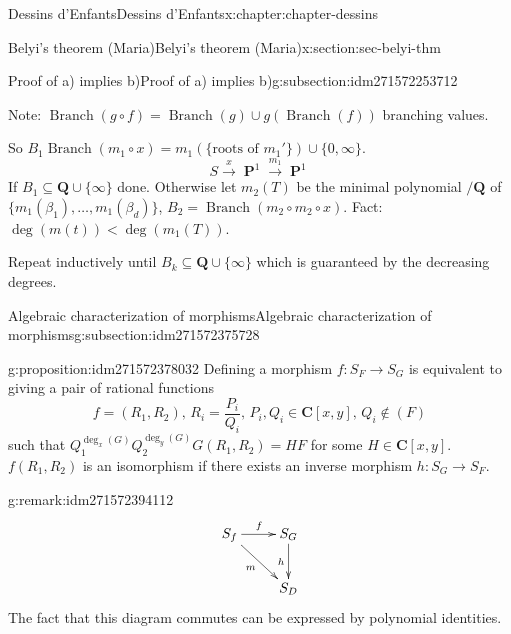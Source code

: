 \documentclass[oneside,10pt,]{book}
\numberwithin{equation}{section}
\newcommand{\lb}{[}
\newcommand{\rb}{]}
\newcommand{\QQ}{\mathbf{Q}}
\newcommand{\CC}{\mathbf{C}}
\DeclareMathOperator{\PP}{\mathbf{P}}
\newcommand{\lt}{<}
\begin{document}
\begin{chapterptx}{Dessins d'Enfants}{}{Dessins d'Enfants}{}{}{x:chapter:chapter-dessins}
\begin{sectionptx}{Belyi's theorem (Maria)}{}{Belyi's theorem (Maria)}{}{}{x:section:sec-belyi-thm}
\begin{subsectionptx}{Proof of a) implies b)}{}{Proof of a) implies b)}{}{}{g:subsection:idm271572253712}
\par
Note: \(\operatorname{Branch}(g\circ f) = \operatorname{Branch}(g) \cup g(\operatorname{Branch}(f))\) branching values.%
\par
So \(B_1 \operatorname{Branch}(m_1 \circ x) = m_1(\{\text{roots of }m_1'\}) \cup\{0,\infty\}\).%
\begin{equation*}
S\xrightarrow x \PP^1 \xrightarrow{m_1} \PP^1
\end{equation*}
If \(B_1 \subseteq \QQ \cup \{\infty\}\) done. Otherwise let \(m_2(T) \) be the minimal polynomial \(/\QQ\) of \(\{m_1(\beta_1) ,\ldots, m_1(\beta_d) \}\), \(B_2 = \operatorname{Branch}(m_2\circ m_2 \circ x)\). Fact: \(\deg(m(t)) \lt \deg(m_1(T))\).%
\par
Repeat inductively until \(B_k \subseteq \QQ \cup \{\infty\}\) which is guaranteed by the decreasing degrees.%
\end{subsectionptx}
%
%
\typeout{************************************************}
\typeout{************************************************}
%
\begin{subsectionptx}{Algebraic characterization of morphisms}{}{Algebraic characterization of morphisms}{}{}{g:subsection:idm271572375728}
\begin{proposition}{}{}{g:proposition:idm271572378032}%
Defining a morphism \(f \colon S_F\to S_G\) is equivalent to giving a pair of rational functions%
\begin{equation*}
f=  (R_1, R_2),\,R_i= \frac{P_i}{Q_i},\,    P_i,Q_i\in \CC[x,y],\,Q_i\not\in (F)
\end{equation*}
such that \(Q_1^{\deg_x(G)}Q_2^{\deg_y(G)} G(R_1, R_2) = HF\) for some \(H \in \CC\lb x, y\rb\). \(f(R_1, R_2)\) is an isomorphism if there exists an inverse morphism \(h\colon S_G\to S_F\).%
\end{proposition}
\begin{remark}{}{g:remark:idm271572394112}%
%
\begin{equation*}
\xymatrix{
S_f \ar[r]^f \ar[dr]_m & S_G \ar[d]_h \\
& S_D
}
\end{equation*}
The fact that this diagram commutes can be expressed by polynomial identities.%
\end{remark}
\end{subsectionptx}
%
%
\typeout{************************************************}
\typeout{************************************************}

\end{sectionptx}
\end{chapterptx}
\end{document}
